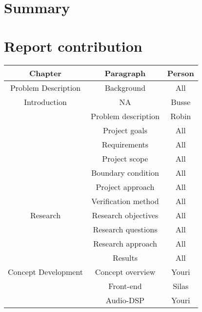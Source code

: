 \begin{justify}

\chapter*{Summary}


\newpage
\tableofcontents
\thispagestyle{empty}

\listoffigures
\thispagestyle{empty}

\listoftables
\thispagestyle{empty}

\newpage
\pagestyle{plain}

\chapter*{Report contribution}	%
\begin{longtable}{|c|c|c|}
	\hline
	\textbf{Chapter} & \textbf{Paragraph} & \textbf{Person} \\ \hline
	Problem Description							& Background					& All	 					\\ \hline
	Introduction								& NA							& Busse 					\\ \hline
												& Problem description			& Robin						\\ \hline
												& Project goals					& All						\\ \hline
												& Requirements					& All 						\\ \hline
												& Project scope					& All 						\\ \hline
												& Boundary condition			& All						\\ \hline
												& Project approach				& All						\\ \hline
												& Verification method			& All						\\ \hline
	Research 									& Research objectives			& All 						\\ \hline
												& Research questions			& All 						\\ \hline
												& Research approach				& All 						\\ \hline
												& Results						& All 						\\ \hline
	Concept Development 						& Concept overview				& Youri						\\ \hline
												& Front-end						& Silas						\\ \hline
												& Audio-DSP						& Youri						\\ \hline

\end{longtable}
\end{justify}
